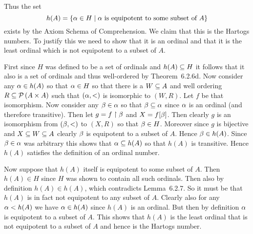 \begin{questions}
{{      Thus the set
      $$
        h(A) = \braces{\a \in H \where \text{$\a$ is equipotent to some subset of $A$}}
      $$
      exists by the Axiom Schema of Comprehension.
      We claim that this is the Hartogs numbers.
      To justify this we need to show that it is an ordinal and that it is the least ordinal which is not equipotent to a subset of $A$.

      First since $H$ was defined to be a set of ordinals and $h(A) \ss H$ it follows that it also is a set of ordinals and thus well-ordered by Theorem~6.2.6d.
      Now consider any $\a \in h(A)$ so that $\a \in H$ so that there is a $W \ss A$ and well ordering $R \ss \pset{A \times A}$ such that $(\a, <)$ is isomorphic to $(W,R)$.
      Let $f$ be that isomorphism.
      Now consider any $\b \in \a$ so that $\b \ss \a$ since $\a$ is an ordinal (and therefore transitive).
      Then let $g = f \rest \b$ and $X = f[\b]$.
      Then clearly $g$ is an isomorphism from $(\b,<)$ to $(X,R)$ so that $\b \in H$.
      Moreover since $g$ is bijective and $X \ss W \ss A$ clearly $\b$ is equipotent to a subset of $A$.
      Hence $\b \in h(A)$.
      Since $\b \in \a$ was arbitrary this shows that $\a \ss h(A)$ so that $h(A)$ is transitive.
      Hence $h(A)$ satisfies the definition of an ordinal number.

      Now suppose that $h(A)$ itself is equipotent to some subset of $A$.
      Then $h(A) \in H$ since $H$ was shown to contain all such ordinals.
      Then also by definition $h(A) \in h(A)$, which contradicts Lemma~6.2.7.
      So it must be that $h(A)$ is in fact not equipotent to any subset of $A$.
      Clearly also for any $\a < h(A)$ we have $\a \in h(A)$ since $h(A)$ is an ordinal.
      But then by definition $\a$ is equipotent to a subset of $A$.
      This shows that $h(A)$ is the least ordinal that is not equipotent to a subset of $A$ and hence is the Hartogs number.
    }
  }

\end{questions}
